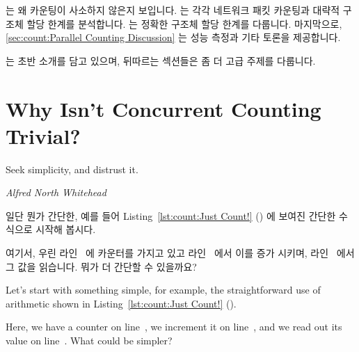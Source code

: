 \QuickQuizLabel{\QcountQIOcnt}

는 왜 카운팅이 사소하지 않은지 보입니다.
는 각각 네트워크 패킷 카운팅과 대략적 구조체 할당 한계를 분석합니다.
는 정확한 구조체 할당 한계를 다룹니다.
마지막으로, \cref{sec:count:Parallel Counting Discussion}
는 성능 측정과 기타 토론을 제공합니다.

는 초반 소개를 담고 있으며, 뒤따르는 섹션들은 좀 더 고급 주제를 다룹니다.

\section{Why Isn't Concurrent Counting Trivial?}
\label{sec:count:Why Isn't Concurrent Counting Trivial?}
%
\epigraph{Seek simplicity, and distrust it.}{\emph{Alfred North Whitehead}}

일단 뭔가 간단한, 예를 들어
Listing~\ref{lst:count:Just Count!} ()
에 보여진 간단한 수식으로 시작해 봅시다.
\begin{fcvref}
여기서, 우린 라인~ 에 카운터를 가지고 있고 라인~ 에서
이를 증가 시키며, 라인~ 에서 그 값을 읽습니다.
뭐가 더 간단할 수 있을까요?
\end{fcvref}

\iffalse

Let's start with something simple, for example, the straightforward
use of arithmetic shown in
Listing~\ref{lst:count:Just Count!} ().
\begin{fcvref}
Here, we have a counter on line~, we increment it on
line~, and we read out its value on line~.
What could be simpler?
\end{fcvref}

